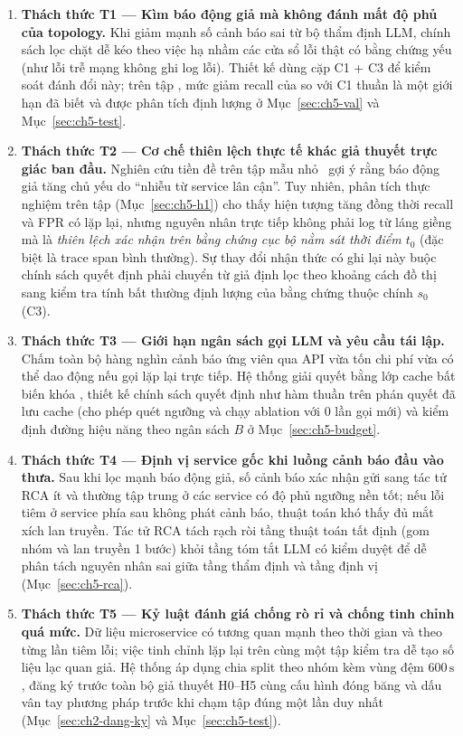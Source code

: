 \begin{enumerate}
  \item \textbf{Thách thức T1 — Kìm báo động giả mà không đánh mất độ phủ của topology.} Khi giảm mạnh số cảnh báo sai từ bộ thẩm định LLM, chính sách lọc chặt dễ kéo theo việc hạ nhầm các cửa sổ lỗi thật có bằng chứng yếu (như lỗi trễ mạng không ghi log lỗi). Thiết kế \CTAV{} dùng cặp C1 + C3 để kiểm soát đánh đổi này; trên tập , mức giảm recall của \CTAV{} so với C1 thuần là một giới hạn đã biết và được phân tích định lượng ở Mục~\ref{sec:ch5-val} và Mục~\ref{sec:ch5-test}.
  \item \textbf{Thách thức T2 — Cơ chế thiên lệch thực tế khác giả thuyết trực giác ban đầu.} Nghiên cứu tiền đề trên tập mẫu nhỏ~\cite{author2026icaetm} gợi ý rằng báo động giả tăng chủ yếu do ``nhiễu từ service lân cận''. Tuy nhiên, phân tích thực nghiệm trên tập  (Mục~\ref{sec:ch5-h1}) cho thấy hiện tượng tăng đồng thời recall và FPR có lặp lại, nhưng nguyên nhân trực tiếp không phải log từ láng giềng mà là \emph{thiên lệch xác nhận trên bằng chứng cục bộ nằm sát thời điểm $t_0$} (đặc biệt là trace span bình thường). Sự thay đổi nhận thức có ghi lại này buộc chính sách quyết định phải chuyển từ giả định lọc theo khoảng cách đồ thị sang kiểm tra tính bất thường định lượng của bằng chứng thuộc chính $s_0$ (C3).
  \item \textbf{Thách thức T3 — Giới hạn ngân sách gọi LLM và yêu cầu tái lập.} Chấm toàn bộ hàng nghìn cảnh báo ứng viên qua API vừa tốn chi phí vừa có thể dao động nếu gọi lặp lại trực tiếp. Hệ thống giải quyết bằng lớp cache bất biến khóa , thiết kế chính sách quyết định như hàm thuần trên phán quyết đã lưu cache (cho phép quét ngưỡng và chạy ablation với 0 lần gọi mới) và kiểm định đường hiệu năng theo ngân sách $B$ ở Mục~\ref{sec:ch5-budget}.
  \item \textbf{Thách thức T4 — Định vị service gốc khi luồng cảnh báo đầu vào thưa.} Sau khi \CTAV{} lọc mạnh báo động giả, số cảnh báo xác nhận gửi sang tác tử RCA ít và thường tập trung ở các service có độ phủ ngưỡng nền tốt; nếu lỗi tiêm ở service phía sau không phát cảnh báo, thuật toán khó thấy đủ mắt xích lan truyền. Tác tử RCA tách rạch ròi tầng thuật toán tất định (gom nhóm và lan truyền 1 bước) khỏi tầng tóm tắt LLM có kiểm duyệt để dễ phân tách nguyên nhân sai giữa tầng thẩm định và tầng định vị (Mục~\ref{sec:ch5-rca}).
  \item \textbf{Thách thức T5 — Kỷ luật đánh giá chống rò rỉ và chống tinh chỉnh quá mức.} Dữ liệu microservice có tương quan mạnh theo thời gian và theo từng lần tiêm lỗi; việc tinh chỉnh lặp lại trên cùng một tập kiểm tra dễ tạo số liệu lạc quan giả. Hệ thống áp dụng chia split theo nhóm  kèm vùng đệm $600\,\text{s}$, đăng ký trước toàn bộ giả thuyết H0--H5 cùng cấu hình đóng băng và dấu vân tay phương pháp trước khi chạm tập  đúng một lần duy nhất (Mục~\ref{sec:ch2-dang-ky} và Mục~\ref{sec:ch5-test}).
\end{enumerate}

